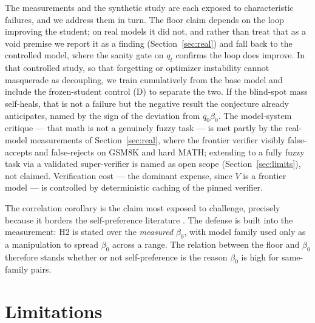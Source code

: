 \documentclass[11pt]{article}
\begin{document}
The measurements and the synthetic study are each exposed to
characteristic failures, and we address them in turn. The floor claim
depends on the loop improving the student; on real models it did not,
and rather than treat that as a void premise we report it as a finding
(Section~\ref{sec:real}) and fall back to the controlled model, where the
sanity gate on \(q_{t}\) confirms the loop does improve. In that
controlled study, so that forgetting or optimizer instability cannot
masquerade as decoupling, we train cumulatively from the base model and
include the frozen-student control (D) to separate the two. If the
blind-spot mass self-heals, that is not a failure but the negative
result the conjecture already anticipates, named by the sign of the
deviation from \(q_{0}\beta_{0}\). The model-system critique --- that
math is not a genuinely fuzzy task --- is met partly by the real-model
measurements of Section~\ref{sec:real}, where the frontier verifier
visibly false-accepts and false-rejects on GSM8K and hard MATH;
extending to a fully fuzzy task via a validated super-verifier is named
as open scope (Section~\ref{sec:limits}), not claimed. Verification cost
--- the dominant expense, since \(V\) is a frontier model --- is
controlled by deterministic caching of the pinned verifier.

The correlation corollary is the claim most exposed to challenge,
precisely because it borders the self-preference literature
\cite{panickssery2024selfpreference}. The defense is built into the
measurement: H2 is stated over the \emph{measured} \(\beta_{0}\), with
model family used only as a manipulation to spread \(\beta_{0}\) across
a range. The relation between the floor and \(\beta_{0}\) therefore
stands whether or not self-preference is the reason \(\beta_{0}\) is
high for same-family pairs.

\section{Limitations}

\protect{}\label{sec:limits}{}
\end{document}
